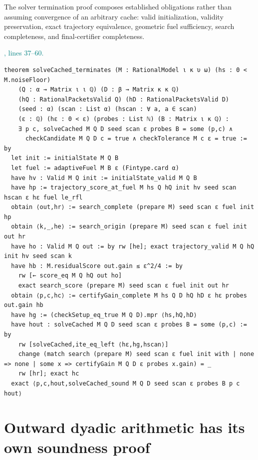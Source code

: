 \documentclass[11pt]{article}\usepackage{needspace}\renewcommand{\paperkind}{Lean companion}\setlength{\parskip}{0.35em}
\begin{document}
The solver termination proof composes established obligations rather than assuming convergence of an arbitrary cache: valid initialization, validity preservation, exact trajectory equivalence, geometric fuel sufficiency, search completeness, and final-certifier completeness.



{\small\textcolor{teal}{, lines 37--60.}\par}

\begin{lstlisting}[style=BayesSource]
theorem solveCached_terminates (M : RationalModel ι κ υ ω) (hs : 0 < M.noiseFloor)
    (Q : α → Matrix ι ι ℚ) (D : β → Matrix κ κ ℚ)
    (hQ : RationalPacketsValid Q) (hD : RationalPacketsValid D)
    (seed : α) (scan : List α) (hscan : ∀ a, a ∈ scan)
    (ε : ℚ) (hε : 0 < ε) (probes : List ℕ) (B : Matrix ι κ ℚ) :
    ∃ p c, solveCached M Q D seed scan ε probes B = some (p,c) ∧
      checkCandidate M Q D c = true ∧ checkTolerance M c ε = true := by
  let init := initialState M Q B
  let fuel := adaptiveFuel M B ε (Fintype.card α)
  have hv : Valid M Q init := initialState_valid M Q B
  have hp := trajectory_score_at_fuel M hs Q hQ init hv seed scan hscan ε hε fuel le_rfl
  obtain ⟨out,hr⟩ := search_complete (prepare M) seed scan ε fuel init hp
  obtain ⟨k,_,he⟩ := search_origin (prepare M) seed scan ε fuel init out hr
  have ho : Valid M Q out := by rw [he]; exact trajectory_valid M Q hQ init hv seed scan k
  have hb : M.residualScore out.gain ≤ ε^2/4 := by
    rw [← score_eq M Q hQ out ho]
    exact search_score (prepare M) seed scan ε fuel init out hr
  obtain ⟨p,c,hc⟩ := certifyGain_complete M hs Q D hQ hD ε hε probes out.gain hb
  have hg := (checkSetup_eq_true M Q D).mpr ⟨hs,hQ,hD⟩
  have hout : solveCached M Q D seed scan ε probes B = some (p,c) := by
    rw [solveCached,ite_eq_left ⟨hε,hg,hscan⟩]
    change (match search (prepare M) seed scan ε fuel init with | none => none | some x => certifyGain M Q D ε probes x.gain) = _
    rw [hr]; exact hc
  exact ⟨p,c,hout,solveCached_sound M Q D seed scan ε probes B p c hout⟩
\end{lstlisting}

\section{Outward dyadic arithmetic has its own soundness proof}
\end{document}

